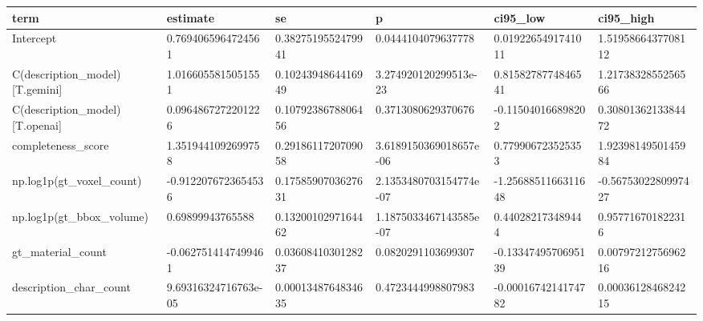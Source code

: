 \begin{tabular}{llllll}
term & estimate & se & p & ci95_low & ci95_high \\\hline
Intercept & 0.7694065964724561 & 0.3827519552479941 & 0.0444104079637778 & 0.0192265491741011 & 1.5195866437708112 \\
C(description\_model)[T.gemini] & 1.0166055815051551 & 0.1024394864416949 & 3.274920120299513e-23 & 0.8158278774846541 & 1.2173832855256566 \\
C(description\_model)[T.openai] & 0.0964867272201226 & 0.1079238678806456 & 0.3713080629370676 & -0.115040166898202 & 0.3080136213384472 \\
completeness\_score & 1.3519441092699758 & 0.2918611720709058 & 3.6189150369018657e-06 & 0.779906723525353 & 1.9239814950145984 \\
np.log1p(gt\_voxel\_count) & -0.9122076723654536 & 0.1758590703627631 & 2.1353480703154774e-07 & -1.2568851166311648 & -0.5675302280997427 \\
np.log1p(gt\_bbox\_volume) & 0.69899943765588 & 0.1320010297164462 & 1.1875033467143585e-07 & 0.440282173489444 & 0.957716701822316 \\
gt\_material\_count & -0.0627514147499461 & 0.0360841030128237 & 0.0820291103699307 & -0.1334749570695139 & 0.0079721275696216 \\
description\_char\_count & 9.69316324716763e-05 & 0.0001348764834635 & 0.4723444998807983 & -0.0001674214174782 & 0.0003612846824215 \\
\end{tabular}
